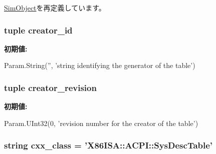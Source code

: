 \hyperlink{classm5_1_1SimObject_1_1SimObject_a17fa61ac3806b481cafee5593b55e5d0}{SimObject}を再定義しています。\hypertarget{classACPI_1_1X86ACPISysDescTable_aae955f21f86557f4b16fc4a48b628955}{
\subsubsection[{creator\_\-id}]{\setlength{\rightskip}{0pt plus 5cm}tuple {\bf creator\_\-id}}}
\label{classACPI_1_1X86ACPISysDescTable_aae955f21f86557f4b16fc4a48b628955}
{\bfseries 初期値:}
\begin{DoxyCode}
Param.String('',
            'string identifying the generator of the table')
\end{DoxyCode}
\hypertarget{classACPI_1_1X86ACPISysDescTable_a8822b97118208412b53ad97e69336f3b}{
\subsubsection[{creator\_\-revision}]{\setlength{\rightskip}{0pt plus 5cm}tuple {\bf creator\_\-revision}}}
\label{classACPI_1_1X86ACPISysDescTable_a8822b97118208412b53ad97e69336f3b}
{\bfseries 初期値:}
\begin{DoxyCode}
Param.UInt32(0,
            'revision number for the creator of the table')
\end{DoxyCode}
\hypertarget{classACPI_1_1X86ACPISysDescTable_a58cd55cd4023648e138237cfc0822ae3}{
\subsubsection[{cxx\_\-class}]{\setlength{\rightskip}{0pt plus 5cm}string {\bf cxx\_\-class} = '{\bf X86ISA::ACPI::SysDescTable}'}}
\label{classACPI_1_1X86ACPISysDescTable_a58cd55cd4023648e138237cfc0822ae3}



